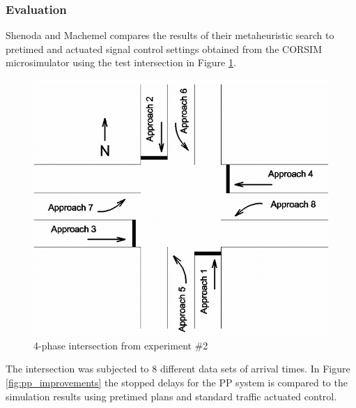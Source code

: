 \subsubsection*{Evaluation}
Shenoda and Machemel compares the results of their metaheuristic search to pretimed and actuated signal control settings obtained from the CORSIM microsimulator using the test intersection in Figure \ref{fig:pp_intersection}.

\begin{figure}[!ht]
\begin{center}
\includegraphics[scale=0.5]{phase-by-phase_testing-intersection.png} 
\end{center}
\caption{4-phase intersection from experiment \#2}
\label{fig:pp_intersection}
\end{figure}

The intersection was subjected to 8 different data sets of arrival times. In Figure \ref{fig:pp_improvements} the stopped delays for the PP system is compared to the simulation results using pretimed plans and standard traffic actuated control.


